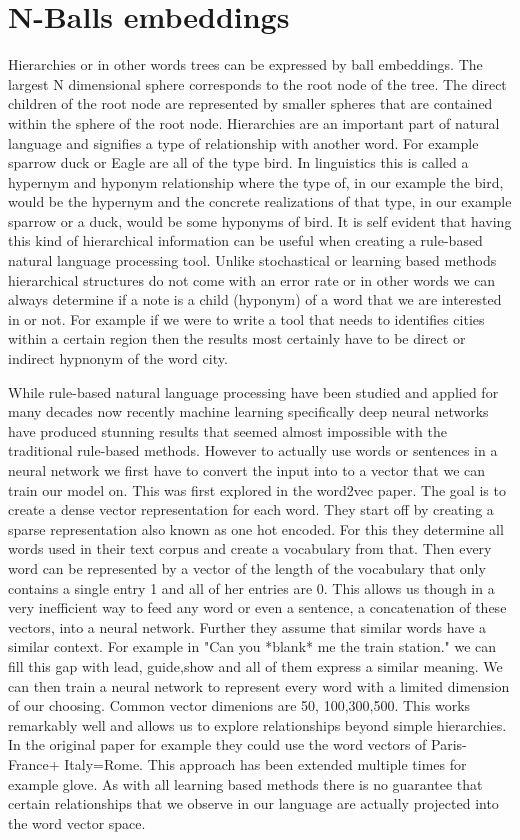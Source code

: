 \documentclass[]{article}
\begin{document}
\section{N-Balls embeddings}
Hierarchies or in other words trees can be expressed by ball embeddings. The largest N dimensional sphere corresponds to the root node of the tree. The direct children of the root node are represented by smaller spheres that are contained within the sphere of the root node. Hierarchies are an important part of natural language and signifies a type of relationship with another word. For example sparrow duck or Eagle are all of the type bird. In linguistics this is called a hypernym and hyponym relationship where the type of, in our example the bird, would be the hypernym and the concrete realizations of that type, in our example sparrow or a duck, would be some hyponyms of bird. It is self evident that having this kind of hierarchical information can be useful when creating a rule-based natural language processing tool. Unlike stochastical or learning based methods hierarchical structures do not come with an error rate or in other words we can always determine if a note is a child (hyponym) of a word that we are interested in or not. For example if we were to write a tool that needs to identifies cities within a certain region then the results most certainly have to be direct or indirect hypnonym of the word city.


While rule-based natural language processing have been studied and applied for many decades now recently machine learning specifically deep neural networks have produced stunning results that seemed almost impossible with the traditional rule-based methods. However to actually use words or sentences in a neural network we first have to convert the input into to a vector that we can train our model on. This was first explored in the word2vec paper. The goal is to create a dense vector representation for each word. They start off by creating a sparse representation also known as one hot encoded. For this they determine all words used in their text corpus and create a vocabulary from that. Then every word can be represented by a vector of the length of the vocabulary that only contains a single entry 1 and all of her entries are 0. This allows us though in a very inefficient way to feed any word or even a sentence, a concatenation of these vectors, into a neural network. Further they assume that similar words have a similar context. For example in "Can you *blank* me the train station." we can fill this gap with lead, guide,show and all of them express a similar meaning. We can then train a neural network to represent every word with a limited dimension of our choosing. Common vector dimenions are 50, 100,300,500. This works remarkably well and allows us to explore relationships beyond simple hierarchies. In the original paper for example they could use the word vectors of Paris-France+ Italy=Rome. This approach has been extended multiple times for example glove. As with all learning based methods there is no guarantee that certain relationships that we observe in our language are actually projected into the word vector space. 
\end{document}
